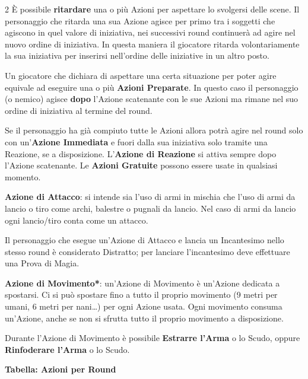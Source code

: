 \begin{multicols}{2}
È possibile \textbf{ritardare} una o più Azioni per aspettare lo svolgersi delle scene. Il personaggio che ritarda una sua Azione agisce per primo tra i soggetti che agiscono in quel valore di iniziativa, nei successivi round continuerà ad agire nel nuovo ordine di iniziativa. In questa maniera il giocatore ritarda volontariamente la sua iniziativa per inserirsi nell'ordine delle iniziative in un altro posto.

Un giocatore che dichiara di aspettare una certa situazione per poter agire equivale ad eseguire una o più \textbf{Azioni Preparate}. In questo caso il personaggio (o nemico) agisce \textbf{dopo} l'Azione scatenante con le sue Azioni ma rimane nel suo ordine di iniziativa al termine del round.

Se il personaggio ha già compiuto tutte le Azioni allora potrà agire nel round solo con un'\textbf{Azione Immediata} e fuori dalla sua iniziativa solo tramite una Reazione, se a disposizione. L'\textbf{Azione di Reazione} si attiva sempre dopo l'Azione scatenante.
Le \textbf{Azioni Gratuite} possono essere usate in qualsiasi momento.

\textbf{Azione di Attacco}: si intende sia l'uso di armi in mischia che l'uso di armi da lancio o tiro come archi, balestre o pugnali da lancio. Nel caso di armi da lancio ogni lancio/tiro conta come un attacco.

Il personaggio che esegue un'Azione di Attacco e lancia un Incantesimo nello stesso round è considerato Distratto; per lanciare l'incantesimo deve effettuare una Prova di Magia.

\textbf{Azione di Movimento*}: un'Azione di Movimento è un'Azione dedicata a spostarsi. Ci si può spostare fino a tutto il proprio movimento (9 metri per umani, 6 metri per nani…) per ogni Azione usata. Ogni movimento consuma un'Azione, anche se non si sfrutta tutto il proprio movimento a disposizione.

Durante l'Azione di Movimento è possibile \textbf{Estrarre l'Arma} o lo Scudo, oppure \textbf{Rinfoderare l'Arma} o lo Scudo.

\medskip

\textbf{Tabella: Azioni per Round}

\medskip


\end{multicols}
